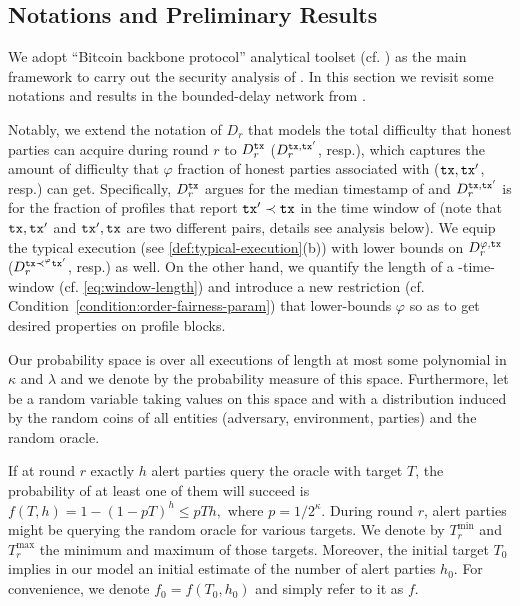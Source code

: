 \subsection{Notations and Preliminary Results}
\label{subsec:notations-preliminary-results}

We adopt ``Bitcoin backbone protocol'' analytical toolset (cf. \cite{C:GarKiaLeo17,EPRINT:GarKiaLeo20}) as the main framework to carry out the security analysis of \Taxis.
%
In this section we revisit some notations and results in the bounded-delay network from \cite{EPRINT:GarKiaLeo20}.

Notably, we extend the notation of $D_r$ that models the total difficulty that honest parties can acquire during round $r$ to $D^\mathtt{tx}_r$ ($D^{\mathtt{tx}, \mathtt{tx}'}_r$, resp.), which captures the amount of difficulty that $\varphi$ fraction of honest parties associated with \tx ($\mathtt{tx}, \mathtt{tx}'$, resp.) can get.
%
Specifically, $D^\mathtt{tx}_r$ argues for the median timestamp of \tx and $D^{\mathtt{tx}, \mathtt{tx}'}_r$ is for the fraction of profiles that report $\mathtt{tx}' \prec \mathtt{tx}$ in the time window of \tx (note that $\mathtt{tx}, \mathtt{tx}'$ and $\mathtt{tx}', \mathtt{tx}$ are two different pairs, details see analysis below).
%
We equip the typical execution (see \cref{def:typical-execution}(b)) with lower bounds on $D^{\varphi, \mathtt{tx}}_r$ ($D^{\mathtt{tx} \prec^\varphi \mathtt{tx}'}_r$, resp.) as well.
%
On the other hand, we quantify the length of a \PBWindowLen-time-window (cf. \cref{eq:window-length}) and introduce a new restriction (cf. Condition~\cref{condition:order-fairness-param}) that lower-bounds $\varphi$ so as to get desired properties on profile blocks.

Our probability space is over all executions of length at most some polynomial in $\kappa$ and $\lambda$ and we denote by \Pr the probability measure of
this space.
%
Furthermore, let \E be a random variable taking values on this space and with a distribution induced by the random coins of all entities (adversary, environment, parties) and the random oracle.

If at round $r$ exactly $h$ alert parties query the oracle with target $T$, the probability of at least one of them will succeed is $f(T, h) = 1 - (1 - p T)^h \le p T h, \text{ where } p = 1 / 2^\kappa$.
%
During round $r$, alert parties might be querying the random oracle for various targets.
%
We denote by $T_r^{\min}$ and $T_r^{\max}$ the minimum and maximum of those targets.
%
Moreover, the initial target $T_0$ implies in our model an initial estimate of the number of alert parties $h_0$. For convenience, we denote $f_0 = f(T_0, h_0)$ and simply refer to it as $f$.

